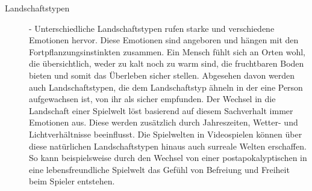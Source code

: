 \begin{description}
\item[Landschaftstypen] - Unterschiedliche Landschaftstypen rufen starke und verschiedene Emotionen hervor. Diese Emotionen sind angeboren und hängen mit den Fortpflanzungsinstinkten zusammen. Ein Mensch fühlt sich an Orten wohl, die übersichtlich, weder zu kalt noch zu warm sind, die fruchtbaren Boden bieten und somit das Überleben sicher stellen. Abgesehen davon werden auch Landschaftstypen, die dem Landschaftstyp ähneln in der eine Person aufgewachsen ist, von ihr als sicher empfunden. Der Wechsel in die Landschaft einer Spielwelt löst basierend auf diesem Sachverhalt immer Emotionen aus. Diese werden zusätzlich durch Jahreszeiten, Wetter- und Lichtverhältnisse beeinflusst. Die Spielwelten in Videospielen können über diese natürlichen Landschaftstypen hinaus auch surreale Welten erschaffen. So kann beispielsweise durch den Wechsel von einer postapokalyptischen in eine lebensfreundliche Spielwelt das Gefühl von Befreiung und Freiheit beim Spieler entstehen.  \cite[S. 26 f.]{Adams:1515529}
%

\end{description}
